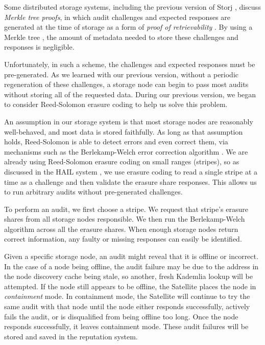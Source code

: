 \documentclass[8pt,fleqn,openany]{book}
\begin{document}
Some distributed storage systems, including the previous version of Storj
\cite{storj-v2}, discuss {\em Merkle tree proofs}, in which audit challenges
and expected responses are generated at the time of storage as a form of
{\em proof of retrievability} \cite{juels}. By using a Merkle tree
\cite{merkle-tree}, the amount of metadata needed to store these
challenges and responses is negligible.

Unfortunately, in such a scheme, the challenges and expected responses must be
pre-generated. As we learned with our previous version, without a periodic
regeneration of these challenges, a storage node can begin to pass most
audits without storing all of the requested data. During our previous version,
we began to consider Reed-Solomon erasure coding to help us solve this problem.

An assumption in our storage system is that most storage nodes are
reasonably well-behaved, and most data is stored faithfully. As long as that
assumption holds, Reed-Solomon is able to detect errors and even correct them,
via mechanisms such as the Berlekamp-Welch error correction algorithm
\cite{bw, rs-intro}.
We are already using Reed-Solomon erasure coding \cite{rs} on small ranges
(stripes), so as discussed in the HAIL system \cite{hail},
we use erasure coding to read a single stripe at a time as a challenge
and then validate the erasure share responses. This allows us to run arbitrary
audits without pre-generated challenges.

To perform an audit, we first choose a stripe. We request that
stripe's erasure shares from all storage nodes responsible. We then run
the Berlekamp-Welch algorithm \cite{bw, rs-intro} across all the
erasure shares. When enough storage nodes return correct information,
any faulty or missing responses can easily be identified.

Given a specific storage node, an audit might reveal that it is offline or
incorrect. In the case of a node being offline, the audit failure
may be due to the address in the node discovery cache being stale, so another,
fresh Kademlia lookup will be attempted. If the node still appears to be offline,
the Satellite places the node in {\em containment} mode. In containment
mode, the Satellite will continue to try the same audit with that node
until the node either responds successfully, actively fails the audit, or
is disqualified from being offline too long. Once the node responds
successfully, it leaves containment mode.
These audit failures will be stored and saved in the reputation system.
\end{document}
